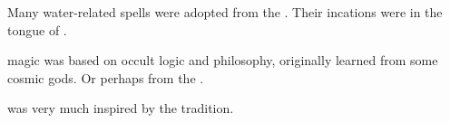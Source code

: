 \begin{gloss}
  
  
  
  
  
  
  
  
  
  \begin{comment}
    \paragraph{Imetric magic}
  \end{comment}
  
  
  
  
  
  
  
  
  
  
  \begin{comment}
    \paragraph{Naga magic}
  \end{comment}
  Many water-related spells were adopted from the \nagae. 
  Their incations were in the tongue of .
  
  
  
  
  
  
  
  
  
  \begin{comment}\paragraph{\QuilJaaran magic}\end{comment}
  \QuilJaaran{} magic was based on occult logic and philosophy, originally learned from some cosmic gods. 
  Or perhaps from the \voyagers. 
  
   was very much inspired by the \quiljaaran{} tradition.
  
  
  
  
  
  
  
  
  
  
  \begin{comment}
    \paragraph{\Rethyactic magic}
  \end{comment}
  

\end{gloss}
